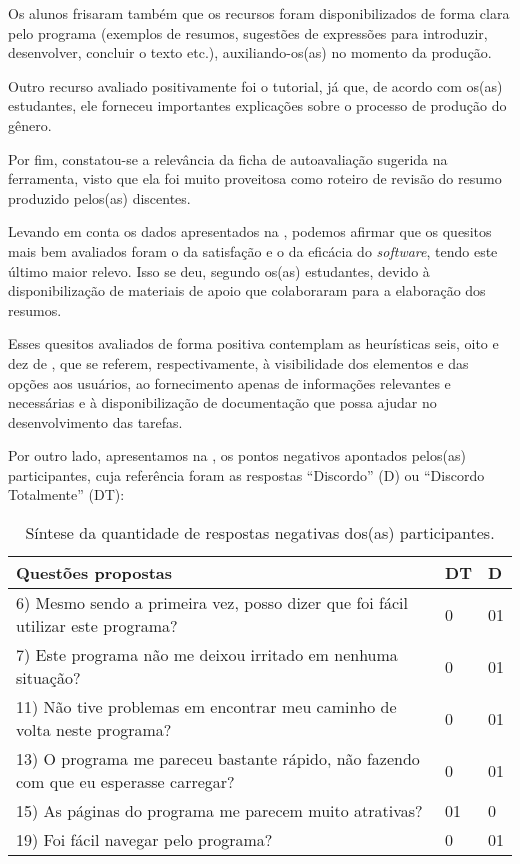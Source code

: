 \documentclass[portuguese]{textolivre}
\begin{document}
Os alunos frisaram também que os recursos foram disponibilizados de forma clara pelo programa (exemplos de resumos, sugestões de expressões para introduzir, desenvolver, concluir o texto etc.), auxiliando-os(as) no momento da produção.

Outro recurso avaliado positivamente foi o tutorial, já que, de acordo com os(as) estudantes, ele forneceu importantes explicações sobre o processo de produção do gênero.

Por fim, constatou-se a relevância da ficha de autoavaliação sugerida na ferramenta, visto que ela foi muito proveitosa como roteiro de revisão do resumo produzido pelos(as) discentes.

Levando em conta os dados apresentados na , podemos afirmar que os quesitos mais bem avaliados foram o da satisfação e o da eficácia do \textit{software}, tendo este último maior relevo. Isso se deu, segundo os(as) estudantes, devido à disponibilização de materiais de apoio que colaboraram para a elaboração dos resumos.

Esses quesitos avaliados de forma positiva contemplam as heurísticas seis, oito e dez de \textcite{nielsen1994}, que se referem, respectivamente, à visibilidade dos elementos e das opções aos usuários, ao fornecimento apenas de informações relevantes e necessárias e à disponibilização de documentação que possa ajudar no desenvolvimento das tarefas.

Por outro lado, apresentamos na , os pontos negativos apontados pelos(as) participantes, cuja referência foram as respostas “Discordo” (D) ou “Discordo Totalmente” (DT):

\begin{table}[htbp]
\begin{threeparttable}
\caption{Síntese da quantidade de respostas negativas dos(as) participantes.}
\label{tbl3}
\centering
\begin{tabular}{p{10cm} ll}
\toprule
Questões propostas & DT & D \\ 
 \midrule
6) Mesmo sendo a primeira vez, posso dizer que foi fácil utilizar este programa? & 0 & 01 \\
7) Este programa não me deixou irritado em nenhuma situação? & 0 & 01 \\
11) Não tive problemas em encontrar meu caminho de volta neste programa? & 0 & 01 \\
13) O programa me pareceu bastante rápido, não fazendo com que eu esperasse carregar? & 
0 & 01 \\
15) As páginas do programa me parecem muito atrativas? & 01 & 0 \\
19) Foi fácil navegar pelo programa? & 0 & 01 \\
\bottomrule
\end{tabular}
\end{threeparttable}
\end{table}
\end{document}
